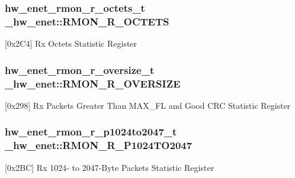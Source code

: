 \subsubsection[{\texorpdfstring{R\+M\+O\+N\+\_\+\+R\+\_\+\+O\+C\+T\+E\+TS}{RMON_R_OCTETS}}]{ {\bf hw\+\_\+enet\+\_\+rmon\+\_\+r\+\_\+octets\+\_\+t} \+\_\+hw\+\_\+enet\+::\+R\+M\+O\+N\+\_\+\+R\+\_\+\+O\+C\+T\+E\+TS}\hypertarget{struct__hw__enet_a68bba26efd7a635e8257fd916c9ec7e9}{}\label{struct__hw__enet_a68bba26efd7a635e8257fd916c9ec7e9}
\mbox{[}0x2\+C4\mbox{]} Rx Octets Statistic Register 
\subsubsection[{\texorpdfstring{R\+M\+O\+N\+\_\+\+R\+\_\+\+O\+V\+E\+R\+S\+I\+ZE}{RMON_R_OVERSIZE}}]{ {\bf hw\+\_\+enet\+\_\+rmon\+\_\+r\+\_\+oversize\+\_\+t} \+\_\+hw\+\_\+enet\+::\+R\+M\+O\+N\+\_\+\+R\+\_\+\+O\+V\+E\+R\+S\+I\+ZE}\hypertarget{struct__hw__enet_a89424829f10197b4b03621cebaf32453}{}\label{struct__hw__enet_a89424829f10197b4b03621cebaf32453}
\mbox{[}0x298\mbox{]} Rx Packets Greater Than M\+A\+X\+\_\+\+FL and Good C\+RC Statistic Register 
\subsubsection[{\texorpdfstring{R\+M\+O\+N\+\_\+\+R\+\_\+\+P1024\+T\+O2047}{RMON_R_P1024TO2047}}]{ {\bf hw\+\_\+enet\+\_\+rmon\+\_\+r\+\_\+p1024to2047\+\_\+t} \+\_\+hw\+\_\+enet\+::\+R\+M\+O\+N\+\_\+\+R\+\_\+\+P1024\+T\+O2047}\hypertarget{struct__hw__enet_a14ad35d237bd71cfbea4e9575649729e}{}\label{struct__hw__enet_a14ad35d237bd71cfbea4e9575649729e}
\mbox{[}0x2\+BC\mbox{]} Rx 1024-\/ to 2047-\/\+Byte Packets Statistic Register 
